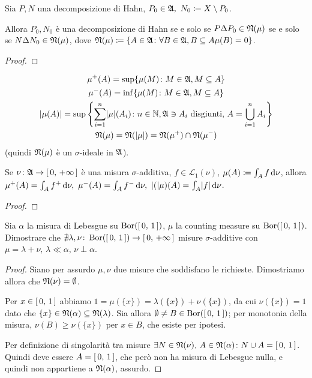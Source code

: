 \documentclass[../EserciziIstituzioniAnalisi.tex]{subfiles}
\begin{document}
\begin{exercise}
  Sia $P,N$ una decomposizione di Hahn, $P_0\in\gA,\ N_0\coloneqq X\setminus P_0$.

  Allora $P_0,N_0$ è una decomposizione di Hahn se e solo se $P\Delta P_0\in\mathfrak N(\mu)$ se e solo se $N\Delta N_0\in\mathfrak N(\mu)$, dove $\mathfrak N(\mu)\coloneqq\{A\in\mathfrak A\colon \forall B\in \mathfrak A, B\subseteq A \mu(B)=0\}$.
\end{exercise}
\begin{proof}
  
\end{proof}
\begin{exercise}
  \begin{gather*}
    \mu^+(A)=\sup\{\mu(M)\colon M\in \mathfrak A, M\subseteq A\}\\
    \mu^-(A)=\inf\{\mu(M)\colon M\in \mathfrak A, M\subseteq A\}\\
    \lvert\mu(A)\rvert=\sup\left\{\sum_{i=1}^n\lvert\mu\rvert(A_i)\colon n\in \mathbb N, \mathfrak A\ni A_i \text{ disgiunti, }A=\bigcup_{i=1}^{n}A_i\right\}\\
    \mathfrak N(\mu)=\mathfrak N(\lvert\mu\rvert)=\mathfrak N(\mu^+)\cap\mathfrak N(\mu^-)
  \end{gather*}
  (quindi $\mathfrak N(\mu)$ è un $\sigma$-ideale in  $\mathfrak A$).
  
  Se $\nu\colon \mathfrak A\to\left[\,0,\,+\infty\,\right]$ è una misura $\sigma$-additiva, $f\in\mathcal{L}_1(\nu)$, $\mu(A)\coloneqq\int_Af\,\mathrm d\nu$,
  allora $\mu^+(A)=\int_Af^+\de \nu,\ \mu^-(A)=\int_Af^-\de\nu,\ \abs(\mu)(A)=\int_A\abs{f}\de\nu$.
\end{exercise}
\begin{proof}
  
\end{proof}
\begin{exercise}
  Sia $\alpha$ la misura di Lebesgue su $\operatorname{Bor}(\left[\,0,\,1\,\right])$, $\mu$ la counting measure su $\operatorname{Bor}(\left[\,0,\,1\,\right])$.
  Dimostrare che $\nexists\lambda,\nu\colon\operatorname{Bor}(\left[\,0,\,1\,\right])\to \left[\,0,\,+\infty\,\right]$ misure $\sigma$-additive con $\mu=\lambda+\nu,\, \lambda \ll \alpha,\, \nu \perp \alpha$.
\end{exercise}
\begin{proof}
  Siano per assurdo $\mu, \nu$ due misure che soddisfano le richieste.
  Dimostriamo allora che $\mathfrak N(\nu)=\emptyset$.

  Per $x\in\left[\,0,\,1\,\right]$ abbiamo $1=\mu(\{x\})=\lambda(\{x\})+\nu(\{x\})$, da cui $\nu(\{x\})=1$ dato che $\{x\}\in\mathfrak N(\alpha)\subseteq\mathfrak N(\lambda)$.
  Sia allora $\emptyset\neq B\in\operatorname{Bor}(\left[\,0,\,1\,\right])$; per monotonia della misura, $\nu(B)\geq\nu(\{x\})$ per $x\in B$, che esiste per ipotesi.

  Per definizione di singolarità tra misure $\exists N\in\mathfrak N(\nu),\, A\in\mathfrak N(\alpha)\colon N\cup A=\left[\,0,\,1\,\right]$. Quindi deve essere $A=\left[\,0,\,1\,\right]$, che però non ha misura di Lebesgue nulla, e quindi non appartiene a $\mathfrak N(\alpha)$, assurdo.
\end{proof}
\end{document}
